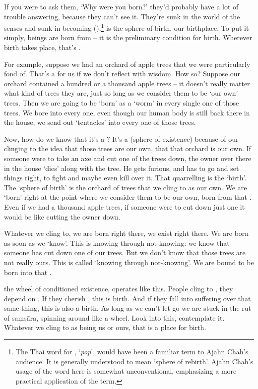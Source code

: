 If you were to ask them, `Why were you born?' they'd probably have a lot of trouble answering, because they can't see it. They're sunk in the world of the senses and sunk in becoming ().\footnote{The Thai word for , `\textit{pop}', would have been a familiar term to Ajahn Chah's audience. It is generally understood to mean `sphere of rebirth'. Ajahn Chah's usage of the word here is somewhat unconventional, emphasizing a more practical application of the term.}  is the sphere of birth, our birthplace. To put it simply, beings are born from  -- it is the preliminary condition for birth. Wherever birth takes place, that's . 

For example, suppose we had an orchard of apple trees that we were particularly fond of. That's a  for us if we don't reflect with wisdom. How so? Suppose our orchard contained a hundred or a thousand apple trees -- it doesn't really matter what kind of trees they are, just so long as we consider them to be `our own' trees. Then we are going to be `born' as a `worm' in every single one of those trees. We bore into every one, even though our human body is still back there in the house, we send out `tentacles' into every one of those trees. 

Now, how do we know that it's a ? It's a  (sphere of existence) because of our clinging to the idea that those trees are our own, that that orchard is our own. If someone were to take an axe and cut one of the trees down, the owner over there in the house `dies' along with the tree. He gets furious, and has to go and set things right, to fight and maybe even kill over it. That quarrelling is the `birth'. The `sphere of birth' is the orchard of trees that we cling to as our own. We are `born' right at the point where we consider them to be our own, born from that . Even if we had a thousand apple trees, if someone were to cut down just one it would be like cutting the owner down. 

Whatever we cling to, we are born right there, we exist right there. We are born as soon as we `know'. This is knowing through not-knowing: we know that someone has cut down one of our trees. But we don't know that those trees are not really ours. This is called `knowing through not-knowing'. We are bound to be born into that . 

 the wheel of conditioned existence, operates like this. People cling to , they depend on . If they cherish , this is birth. And if they fall into suffering over that same thing, this is also a birth. As long as we can't let go we are stuck in the rut of sa\d{m}s\=ara, spinning around like a wheel. Look into this, contemplate it. Whatever we cling to as being us or ours, that is a place for birth. 

